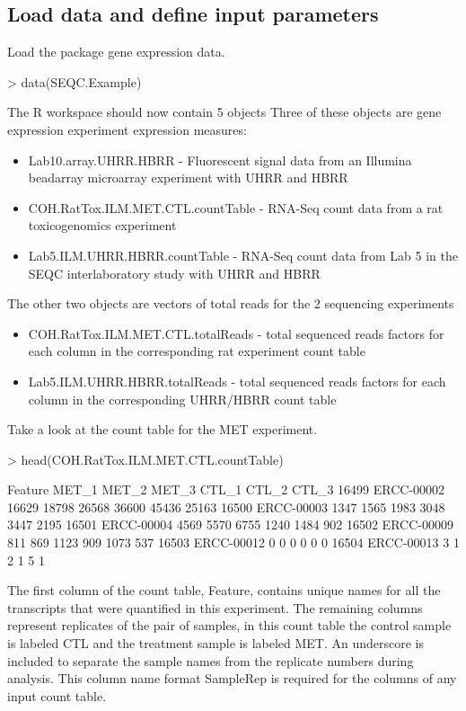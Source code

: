 \documentclass{article}
\begin{document}
\subsection{Load data and define input parameters} 

Load the package gene expression data.
\begin{Schunk}
\begin{Sinput}
> data(SEQC.Example)
\end{Sinput}
\end{Schunk}

The R workspace should now contain 5 objects
Three of these objects are gene expression experiment expression measures:
\begin{itemize}
  \item Lab10.array.UHRR.HBRR - Fluorescent signal data from an Illumina 
        beadarray microarray experiment with UHRR and HBRR
  \item COH.RatTox.ILM.MET.CTL.countTable - RNA-Seq count data from a
        rat toxicogenomics experiment
  \item Lab5.ILM.UHRR.HBRR.countTable - RNA-Seq count data from Lab 5 in the SEQC
        interlaboratory study with UHRR and HBRR
\end{itemize}
The other two objects are vectors of total reads for the 2 sequencing experiments
\begin{itemize}
  \item COH.RatTox.ILM.MET.CTL.totalReads - total sequenced reads factors for 
        each column in the corresponding rat experiment count table
  \item Lab5.ILM.UHRR.HBRR.totalReads - total sequenced reads factors for 
        each column in the corresponding UHRR/HBRR count table
\end{itemize}

Take a look at the count table for the MET experiment.
\begin{Schunk}
\begin{Sinput}
> head(COH.RatTox.ILM.MET.CTL.countTable)
\end{Sinput}
\begin{Soutput}
         Feature MET_1 MET_2 MET_3 CTL_1 CTL_2 CTL_3
16499 ERCC-00002 16629 18798 26568 36600 45436 25163
16500 ERCC-00003  1347  1565  1983  3048  3447  2195
16501 ERCC-00004  4569  5570  6755  1240  1484   902
16502 ERCC-00009   811   869  1123   909  1073   537
16503 ERCC-00012     0     0     0     0     0     0
16504 ERCC-00013     3     1     2     1     5     1
\end{Soutput}
\end{Schunk}
The first column of the count table, Feature, contains unique names for all
the transcripts that were quantified in this experiment. The remaining columns 
represent replicates of the pair of samples, in this count table 
the control sample is labeled CTL and the treatment sample is labeled MET. An 
underscore is included to separate the sample names from the replicate numbers 
during analysis. This column name format Sample\textunderscore{}Rep is required 
for the columns of any input count table.
\end{document}
